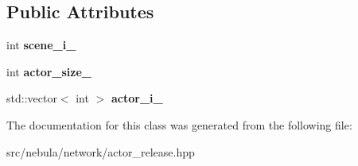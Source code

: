 \subsection*{Public Attributes}
\begin{DoxyCompactItemize}
\item 
\hypertarget{classneb_1_1packet_1_1actor__release_a93c67e65fd2391fa5788ea4df62dea83}{
int {\bfseries scene\_\-i\_\-}}
\label{classneb_1_1packet_1_1actor__release_a93c67e65fd2391fa5788ea4df62dea83}

\item 
\hypertarget{classneb_1_1packet_1_1actor__release_adb41a9a1ca585fc92c5811a086088fba}{
int {\bfseries actor\_\-size\_\-}}
\label{classneb_1_1packet_1_1actor__release_adb41a9a1ca585fc92c5811a086088fba}

\item 
\hypertarget{classneb_1_1packet_1_1actor__release_a38a61811df9631de91ded02972d2e23b}{
std::vector$<$ int $>$ {\bfseries actor\_\-i\_\-}}
\label{classneb_1_1packet_1_1actor__release_a38a61811df9631de91ded02972d2e23b}

\end{DoxyCompactItemize}


The documentation for this class was generated from the following file:\begin{DoxyCompactItemize}
\item 
src/nebula/network/actor\_\-release.hpp\end{DoxyCompactItemize}
